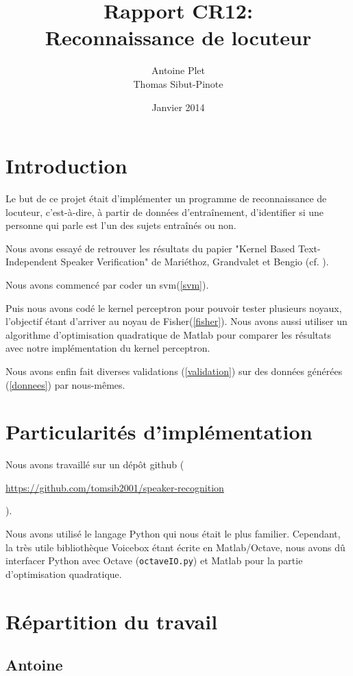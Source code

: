 \documentclass{article}
\title{Rapport CR12:\\
Reconnaissance de locuteur}
\author{Antoine Plet\\
Thomas Sibut-Pinote}
\date{Janvier 2014}
\let\urlorig\url
\renewcommand{\url}[1]{%
  \begin{otherlanguage}{english}\urlorig{#1}\end{otherlanguage}%
}
\begin{document}
\maketitle

\section{Introduction}
Le but de ce projet était d'implémenter un programme de reconnaissance de locuteur, c'est-à-dire, à partir de données d'entraînement, d'identifier si une personne qui parle est l'un des sujets entraînés ou non.

Nous avons essayé de retrouver les résultats du papier "Kernel Based Text-Independent Speaker Verification" de Mariéthoz, Grandvalet et Bengio (cf. \cite{Bengio}).

Nous avons commencé par coder un svm(\ref{svm}).

Puis nous avons codé le kernel perceptron pour pouvoir tester plusieurs noyaux, l'objectif étant d'arriver au noyau de Fisher(\ref{fisher}). Nous avons aussi utiliser un algorithme d'optimisation quadratique de Matlab pour comparer les résultats avec notre implémentation du kernel perceptron.

Nous avons enfin fait diverses validations (\ref{validation}) sur des données générées (\ref{donnees}) par nous-mêmes.

\section{Particularités d'implémentation}
\label{implémentation}
Nous avons travaillé sur un dépôt github (\url{https://github.com/tomsib2001/speaker-recognition}).

Nous avons utilisé le langage Python qui nous était le plus familier. Cependant, la très utile bibliothèque Voicebox étant écrite en Matlab/Octave, nous avons dû interfacer Python avec Octave (\texttt{octaveIO.py}) et Matlab pour la partie d'optimisation quadratique.


\section{Répartition du travail}
\label{répartition}
\subsection{Antoine}
\end{document}
